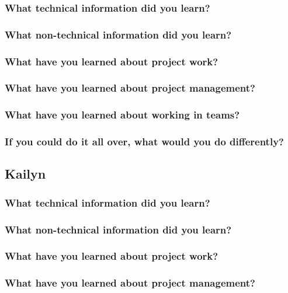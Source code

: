 \documentclass[onecolumn, draftclsnofoot,10pt, compsoc]{IEEEtran}
\begin{document}
\subsubsection{What technical information did you learn?}

\subsubsection{What non-technical information did you learn?}

\subsubsection{What have you learned about project work?}

\subsubsection{What have you learned about project management?}

\subsubsection{What have you learned about working in teams?}

\subsubsection{If you could do it all over, what would you do differently?}

\subsection{Kailyn}

\subsubsection{What technical information did you learn?}

\subsubsection{What non-technical information did you learn?}

\subsubsection{What have you learned about project work?}

\subsubsection{What have you learned about project management?}
\end{document}
